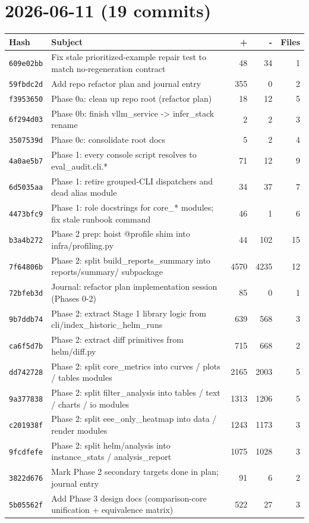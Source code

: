 \section*{2026-06-11 (19 commits)}
\begin{longtable}{@{}p{}p{}r r r@{}}
\toprule Hash & Subject & + & - & Files \\ \midrule\endhead
\texttt{609e02bb} & Fix stale prioritized-example repair test to match no-regeneration contract & 48 & 34 & 1 \\
\texttt{59fbdc2d} & Add repo refactor plan and journal entry & 355 & 0 & 2 \\
\texttt{f3953650} & Phase 0a: clean up repo root (refactor plan) & 18 & 12 & 5 \\
\texttt{6f294d03} & Phase 0b: finish vllm\_service -> infer\_stack rename & 2 & 2 & 3 \\
\texttt{3507539d} & Phase 0c: consolidate root docs & 5 & 2 & 4 \\
\texttt{4a0ae5b7} & Phase 1: every console script resolves to eval\_audit.cli.* & 71 & 12 & 9 \\
\texttt{6d5035aa} & Phase 1: retire grouped-CLI dispatchers and dead alias module & 34 & 37 & 7 \\
\texttt{4473bfc9} & Phase 1: role docstrings for core\_* modules; fix stale runbook command & 46 & 1 & 6 \\
\texttt{b3a4b272} & Phase 2 prep: hoist @profile shim into infra/profiling.py & 44 & 102 & 15 \\
\texttt{7f64806b} & Phase 2: split build\_reports\_summary into reports/summary/ subpackage & 4570 & 4235 & 12 \\
\texttt{72bfeb3d} & Journal: refactor plan implementation session (Phases 0-2) & 85 & 0 & 1 \\
\texttt{9b7ddb74} & Phase 2: extract Stage 1 library logic from cli/index\_historic\_helm\_runs & 639 & 568 & 3 \\
\texttt{ca6f5d7b} & Phase 2: extract diff primitives from helm/diff.py & 715 & 668 & 2 \\
\texttt{dd742728} & Phase 2: split core\_metrics into curves / plots / tables modules & 2165 & 2003 & 5 \\
\texttt{9a377838} & Phase 2: split filter\_analysis into tables / text / charts / io modules & 1313 & 1206 & 5 \\
\texttt{c201938f} & Phase 2: split eee\_only\_heatmap into data / render modules & 1243 & 1173 & 3 \\
\texttt{9fcdfefe} & Phase 2: split helm/analysis into instance\_stats / analysis\_report & 1075 & 1028 & 3 \\
\texttt{3822d676} & Mark Phase 2 secondary targets done in plan; journal entry & 91 & 6 & 2 \\
\texttt{5b05562f} & Add Phase 3 design docs (comparison-core unification + equivalence matrix) & 522 & 27 & 3 \\
\bottomrule\end{longtable}
